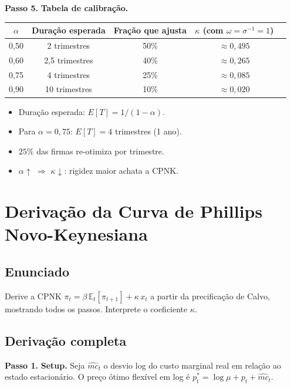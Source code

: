 \documentclass[12pt, a4paper]{article}
\newcommand{\E}{\mathbb{E}}
\begin{document}
\textbf{Passo 5.} \textbf{Tabela de calibração.}
\begin{center}
\begin{tabular}{ccccc}
\toprule
$\alpha$ & Duração esperada & Fração que ajusta & $\kappa$ (com $\omega=\sigma^{-1}=1$) \\
\midrule
0,50 & 2 trimestres & 50\% & $\approx 0{,}495$ \\
0,60 & 2,5 trimestres & 40\% & $\approx 0{,}265$ \\
0,75 & 4 trimestres & 25\% & $\approx 0{,}085$ \\
0,90 & 10 trimestres & 10\% & $\approx 0{,}020$ \\
\bottomrule
\end{tabular}
\end{center}

\begin{resultbox}[title={Modelo de Calvo --- Resultados (Q3)}]
\begin{itemize}[leftmargin=1.5em, itemsep=2pt]
  \item Duração esperada: $E[T] = 1/(1-\alpha)$.
  \item Para $\alpha=0{,}75$: $E[T] = 4$ trimestres (1 ano).
  \item $25\%$ das firmas re-otimiza por trimestre.
  \item $\alpha\uparrow$ $\Rightarrow$ $\kappa\downarrow$: rigidez maior achata a CPNK.
\end{itemize}
\end{resultbox}

\section{Derivação da Curva de Phillips Novo-Keynesiana}

\subsection*{Enunciado}
Derive a CPNK $\pi_t = \beta\,\E_t[\pi_{t+1}] + \kappa\,x_t$ a partir da
precificação de Calvo, mostrando todos os passos. Interprete o coeficiente $\kappa$.

\subsection*{Derivação completa}

\textbf{Passo 1.} \textbf{Setup.}
Seja $\hat{mc}_t$ o desvio log do custo marginal real em relação ao estado estacionário.
O preço ótimo flexível em log é $p_t^* = \log\mu + p_t + \hat{mc}_t$.
\end{document}

